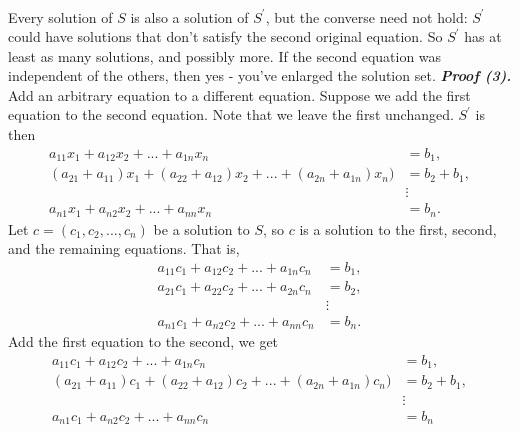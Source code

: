\documentclass{report}
\begin{document}
\begin{itemize}
\begin{align*}
            \end{align*}
            \bigbreak \noindent 
            Every solution of $S$ is also a solution of $S^{\prime}$, but the converse need not hold: $S^{\prime}$ could have solutions that don’t satisfy the second original equation. 
            \bigbreak \noindent 
            So $S^{\prime}$ has at least as many solutions, and possibly more. If the second equation was independent of the others, then yes - you've enlarged the solution set.
            \bigbreak \noindent 
            \textbf{\textit{Proof (3).}} Add an arbitrary equation to a different equation. Suppose we add the first equation to the second equation. Note that we leave the first unchanged. $S^{\prime}$ is then
             \begin{align*}
                a_{11}x_{1} + a_{12}x_{2} + ... + a_{1n}x_{n} &= b_{1},\\
                (a_{21}+a_{11})x_{1} + (a_{22}+a_{12})x_{2} + ... + (a_{2n} + a_{1n})x_{n}) &= b_{2} + b_{1},\\
                                                                                            &\vdots\\
                a_{n1}x_{1} + a_{n2}x_{2} +  ... + a_{nn}x_{n} &= b_{n}
            .\end{align*}
            Let $c = (c_{1}, c_{2}, ..., c_{n}) $ be a solution to $S$, so $c$ is a solution to the first, second, and the remaining equations. That is, 
            \begin{align*}
                a_{11}c_{1} + a_{12}c_{2} + ... + a_{1n}c_{n} &= b_{1},\\
                a_{21}c_{1} + a_{22}c_{2} + ... + a_{2n}c_{n} &= b_{2},\\
                                                              &\vdots\\
                a_{n1}c_{1} + a_{n2}c_{2} +  ... + a_{nn}c_{n} &= b_{n}
            .\end{align*}
            Add the first equation to the second, we get
             \begin{align*}
                a_{11}c_{1} + a_{12}c_{2} + ... + a_{1n}c_{n} &= b_{1},\\
                (a_{21}+a_{11})c_{1} + (a_{22}+a_{12})c_{2} + ... + (a_{2n} + a_{1n})c_{n}) &= b_{2} + b_{1},\\
                                                                                            &\vdots\\
                a_{n1}c_{1} + a_{n2}c_{2} +  ... + a_{nn}c_{n} &= b_{n}

\end{align*}
\end{itemize}
\end{document}
